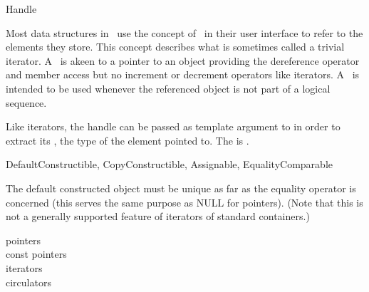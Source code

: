 
\begin{ccRefConcept}{Handle}


\ccDefinition
  
Most data structures in \cgal\ use the concept of \ccRefName\ in their user
interface to refer to the elements they store.  This concept describes what is
sometimes called a trivial iterator.  A \ccRefName\ is akeen to a pointer to
an object providing the dereference operator  and member
access  but no increment or decrement operators like
iterators.  A \ccRefName\ is intended to be used whenever the referenced
object is not part of a logical sequence.
 
Like iterators, the handle can be passed as template argument to
 in order to extract its ,
the type of the element pointed to.
The  is .

\ccRefines DefaultConstructible, CopyConstructible, Assignable, EqualityComparable

The default constructed object must be unique as far as the equality
operator is concerned (this serves the same purpose as NULL for pointers).
(Note that this is not a generally supported feature of iterators of
standard containers.)

\ccCreation
{}  %


\ccGlue
{}

\ccHasModels
pointers\\
const pointers\\
iterators\\
circulators

\end{ccRefConcept}
